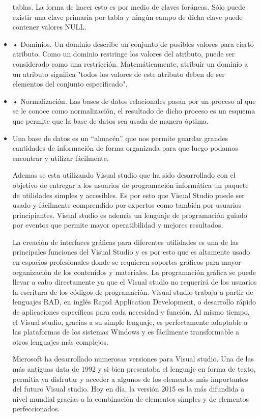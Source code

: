 \begin{itemize}
tablas. La forma de hacer esto es por medio de claves foráneas. Sólo puede
existir una clave primaria por tabla y ningún campo de dicha clave puede
contener valores NULL.
\item
• Dominios. Un dominio describe un conjunto de posibles valores para cierto
atributo. Como un dominio restringe los valores del atributo, puede ser
considerado como una restricción. Matemáticamente, atribuir un dominio a un
atributo significa "todos los valores de este atributo deben de ser elementos
del conjunto especificado".
\item
• Normalización. Las bases de datos relacionales pasan por un proceso al
que se le conoce como normalización, el resultado de dicho proceso es un
esquema que permite que la base de datos sea usada de manera óptima.

    \item Una base de datos es un “almacén” que nos permite guardar grandes cantidades de información de forma organizada para que luego podamos encontrar y utilizar fácilmente.

Ademas se esta utilizando Visual studio que ha sido desarrollado con el objetivo de entregar a los usuarios de programación informática un paquete de utilidades simples y accesibles. Es por esto que Visual Studio puede ser usado y fácilmente comprendido por expertos como también por usuarios principiantes. Visual studio es además un lenguaje de programación guiado por eventos que permite mayor operatibilidad y mejores resultados.

La creación de interfaces gráficas para diferentes utilidades es una de las principales funciones del Visual Studio y es por esto que es altamente usado en espacios profesionales donde se requieren soportes gráficos para mayor organización de los contenidos y materiales. La programación gráfica se puede llevar a cabo directamente ya que el Visual studio no requerirá de los usuarios la escritura de los códigos de programación. Visual studio trabaja a partir de lenguajes RAD, en inglés Rapid Application Development, o desarrollo rápido de aplicaciones específicas para cada necesidad y función. Al mismo tiempo, el Visual studio, gracias a su simple lenguaje, es perfectamente adaptable a las plataformas de los sistemas Windows y es fácilmente transformable a otros lenguajes más complejos.

Microsoft ha desarrollado numerosas versiones para Visual studio. Una de las más antiguas data de 1992 y si bien presentaba el lenguaje en forma de texto, permitía ya disfrutar y acceder a algunos de los elementos más importantes del futuro Visual studio. Hoy en día, la versión 2015 es la más difundida a nivel mundial gracias a la combinación de elementos simples y de elementos perfeccionados.


\end{itemize}